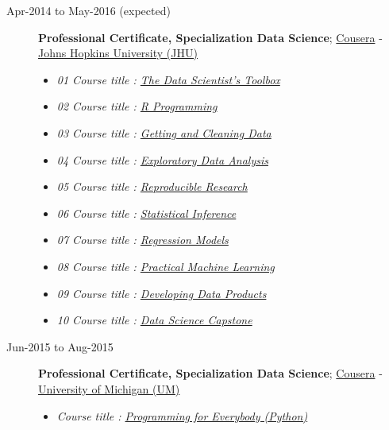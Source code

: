 \documentclass[]{article}
\providecommand{\tightlist}{%
  \setlength{\itemsep}{0pt}\setlength{\parskip}{0pt}}
\begin{document}
\begin{description}
\item[Apr-2014 to May-2016 (expected)]
\textbf{Professional Certificate, Specialization Data Science};
\href{http://www.coursera.org}{Cousera} -
\href{https://www.jhu.edu/}{Johns Hopkins University (JHU)}

\begin{itemize}
\tightlist
\item
  \emph{01 Course title :
  \href{https://www.coursera.org/account/accomplishments/records/AjMdkzyHyA2JWRRL}{The
  Data Scientist's Toolbox}}
\item
  \emph{02 Course title :
  \href{https://www.coursera.org/account/accomplishments/certificate/VBB2XUA29B}{R
  Programming}}
\item
  \emph{03 Course title :
  \href{https://www.coursera.org/account/accomplishments/records/Q5HBLbpBekrW43Jd}{Getting
  and Cleaning Data}}
\item
  \emph{04 Course title :
  \href{https://www.coursera.org/account/accomplishments/records/4Gz8BmPsnuknW93A}{Exploratory
  Data Analysis}}
\item
  \emph{05 Course title :
  \href{https://www.coursera.org/account/accomplishments/records/xpNfvxWs8uMMYrjs}{Reproducible
  Research}}
\item
  \emph{06 Course title :
  \href{https://www.coursera.org/account/accomplishments/records/jXzs4bAFXZfJ3Dne}{Statistical
  Inference}}
\item
  \emph{07 Course title :
  \href{https://www.coursera.org/account/accomplishments/records/Su7PgrMXVGYrU4cM}{Regression
  Models}}
\item
  \emph{08 Course title :
  \href{https://www.coursera.org/account/accomplishments/records/j6DpQhLYeRj54dvS}{Practical
  Machine Learning}}
\item
  \emph{09 Course title :
  \href{https://www.coursera.org/account/accomplishments/records/ERvuyAZm6CG45EUS}{Developing
  Data Products}}
\item
  \emph{10 Course title : \href{}{Data Science Capstone}}
\end{itemize}
\item[Jun-2015 to Aug-2015]
\textbf{Professional Certificate, Specialization Data Science};
\href{http://www.coursera.org}{Cousera} -
\href{https://www.umich.edu/}{University of Michigan (UM)}

\begin{itemize}
\tightlist
\item
  \emph{Course title :
  \href{https://www.coursera.org/account/accomplishments/records/GA4cGW59ETHAevCa}{Programming
  for Everybody (Python)}}
\end{itemize}
\end{description}
\end{document}
